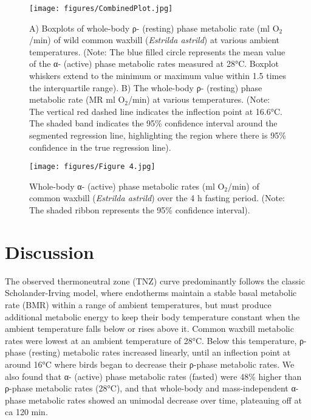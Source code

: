\documentclass[10pt, twoside]{book} %
\begin{document}
\renewcommand{\thefigure}{3.\arabic{figure}}
	\begin{figure}[h!]
		\begin{center}
\small
			\texttt{[image: figures/CombinedPlot.jpg]}
		\end{center}
		\begin{footnotesize}
			\caption{\footnotesize A) Boxplots of whole-body ρ- (resting) phase metabolic rate (ml O$_{\text{2}}$/min) of wild common waxbill (\textit{Estrilda astrild}) at various ambient temperatures. (Note: The blue filled circle represents the mean value of the α- (active) phase metabolic rates measured at 28°C. Boxplot whiskers extend to the minimum or maximum value within 1.5 times the interquartile range). B) The whole-body ρ- (resting) phase metabolic rate (MR ml O$_{\text{2}}$/min) at various temperatures. (Note: The vertical red dashed line indicates the inflection point at 16.6°C. The shaded band indicates the 95\% confidence interval around the segmented regression line, highlighting the region where there is 95\% confidence in the true regression line).\label{fig4.1}}
		\end{footnotesize}
	\end{figure}

\clearpage

\renewcommand{\thefigure}{3.\arabic{figure}}
	\begin{figure}[h!]
		\begin{center}
\small
			\texttt{[image: figures/Figure 4.jpg]}
		\end{center}
		\begin{footnotesize}
			\caption{\footnotesize Whole-body α- (active) phase metabolic rates (ml O$_{\text{2}}$/min) of common waxbill (\textit{Estrilda astrild}) over the 4 h fasting period. (Note: The shaded ribbon represents the 95\% confidence interval).\label{fig4.1}}
		\end{footnotesize}
	\end{figure}

\clearpage

\section{Discussion}
The observed thermoneutral zone (TNZ) curve predominantly follows the classic Scholander-Irving model, where endotherms maintain a stable basal metabolic rate (BMR) within a range of ambient temperatures, but must produce additional metabolic energy to keep their body temperature constant when the ambient temperature falls below or rises above it. Common waxbill metabolic rates were lowest at an ambient temperature of 28°C. Below this temperature, ρ-phase (resting) metabolic rates increased linearly, until an inflection point at around 16°C where birds began to decrease their ρ-phase metabolic rates. We also found that α- (active) phase metabolic rates (fasted) were 48\% higher than ρ-phase metabolic rates (28°C), and that whole-body and mass-independent α-phase metabolic rates showed an unimodal decrease over time, plateauing off at ca 120 min.\\
\end{document}
